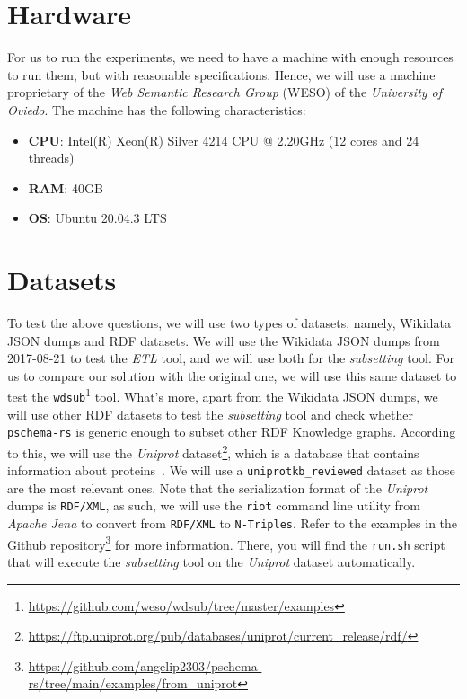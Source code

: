 \section{Hardware}

For us to run the experiments, we need to have a machine with enough resources to run them, but with reasonable specifications. Hence, we will use a machine proprietary of the \textit{Web Semantic Research Group} (WESO) of the \textit{University of Oviedo}. The machine has the following characteristics:

\begin{itemize}
    \itemsep0.5em
    \item \textbf{CPU}: Intel(R) Xeon(R) Silver 4214 CPU @ 2.20GHz (12 cores and 24 threads)
    \item \textbf{RAM}: 40GB
    \item \textbf{OS}: Ubuntu 20.04.3 LTS
\end{itemize}

\section{Datasets}

To test the above questions, we will use two types of datasets, namely, Wikidata JSON dumps and RDF datasets. We will use the Wikidata JSON dumps from 2017-08-21 to test the \textit{ETL} tool, and we will use both for the \textit{subsetting} tool. For us to compare our solution with the original one, we will use this same dataset to test the \texttt{wdsub}\footnote{\url{https://github.com/weso/wdsub/tree/master/examples}} tool. What's more, apart from the Wikidata JSON dumps, we will use other RDF datasets to test the \textit{subsetting} tool and check whether \texttt{pschema-rs} is generic enough to subset other RDF Knowledge graphs. According to this, we will use the \textit{Uniprot} dataset\footnote{\url{https://ftp.uniprot.org/pub/databases/uniprot/current_release/rdf/}}, which is a database that contains information about proteins~\cite{10.1093/nar/gkac1052}. We will use a \texttt{uniprotkb\_reviewed} dataset as those are the most relevant ones. Note that the serialization format of the \textit{Uniprot} dumps is \texttt{RDF/XML}, as such, we will use the \texttt{riot} command line utility from \textit{Apache Jena} to convert from \texttt{RDF/XML} to \texttt{N-Triples}. Refer to the examples in the Github repository\footnote{\url{https://github.com/angelip2303/pschema-rs/tree/main/examples/from_uniprot}} for more information. There, you will find the \texttt{run.sh} script that will execute the \textit{subsetting} tool on the \textit{Uniprot} dataset automatically.
